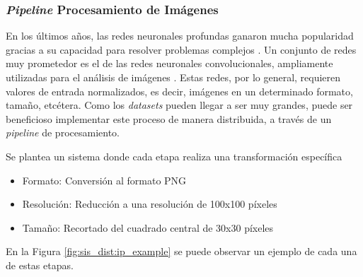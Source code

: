 \documentclass[11pt]{article}
\let\Oldsubsubsection\subsubsection
\renewcommand{\subsubsection}{\FloatBarrier\Oldsubsubsection}
\newcommand{\english}[1]{\textit{#1}}
\begin{document}
\newpage

\subsubsection{\english{Pipeline} Procesamiento de Imágenes} \label{sec:ip_desc}

En los últimos años, las redes neuronales profundas ganaron mucha popularidad gracias a su capacidad para resolver problemas complejos \cite{sis_dist:dnn}. Un conjunto de redes muy prometedor es el de las redes neuronales convolucionales, ampliamente utilizadas para el análisis de imágenes \cite{sis_dist:cnn}. Estas redes, por lo general, requieren valores de entrada normalizados, es decir, imágenes en un determinado formato, tamaño, etcétera. Como los \english{datasets} pueden llegar a ser muy grandes, puede ser beneficioso implementar este proceso de manera distribuida, a través de un \english{pipeline} de procesamiento.

Se plantea un sistema donde cada etapa realiza una transformación específica
\begin{itemize}
    \item Formato: Conversión al formato PNG \cite{sis_dist:png}
    \item Resolución: Reducción a una resolución de 100x100 píxeles
    \item Tamaño: Recortado del cuadrado central de 30x30 píxeles
\end{itemize}

En la Figura \ref{fig:sis_dist:ip_example} se puede observar un ejemplo de cada una de estas etapas.
\end{document}
